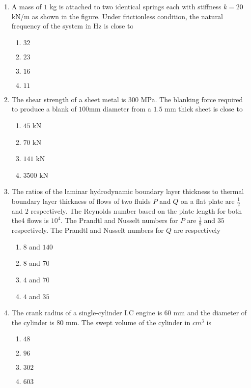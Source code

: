 \documentclass[journal,12pt,onecolumn]{IEEEtran}
\theoremstyle{remark}
\begin{document}
\begin{enumerate}
\item A mass of $1$ kg is attached to two identical springs each with stiffness $k=20$ kN/m as shown in the figure. Under frictionless condition, the natural frequency of the system in Hz is close to

\hfill{}
\begin{enumerate}
\item $32$
\item $23$
\item $16$
\item $11$
\end{enumerate}

\item The shear strength of a sheet metal is $300$ MPa. The blanking force required to produce a blank of $100$mm diameter from a $1.5$ mm thick sheet is close to
\hfill{}
\begin{enumerate}
\item $45$ kN
\item $70$ kN
\item $141$ kN
\item $3500$ kN
\end{enumerate}

\item The ratios of the laminar hydrodynamic boundary layer thickness to thermal boundary layer thickness of flows of two fluids $P$ and $Q$ on a flat plate are $\frac{1}{2}$ and $2$ respectively. The Reynolds number based on the plate length for both the4 flows is $10^4$. The Prandtl and Nusselt numbers for $P$ are $\frac{1}{8}$ and $35$ respectively. The Prandtl and Nusselt numbers for $Q$ are respectively
\hfill{}
\begin{enumerate}
\item $8$ and $140$
\item $8$ and $70$
\item $4$ and $70$
\item $4$ and $35$
\end{enumerate}

\item The crank radius of a single-cylinder I.C engine is $60$ mm and the diameter of the cylinder is $80$ mm. The swept volume of the cylinder in ${cm}^3$ is
\hfill{}
\begin{enumerate}
\item $48$
\item $96$
\item $302$
\item $603$
\end{enumerate}


\end{enumerate}
\end{document}
